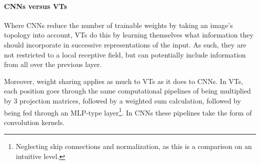





\paragraph{CNNs versus VTs}
Where CNNs reduce the number of trainable weights by taking an image's topology into account, VTs do this by learning themselves what information they should incorporate in successive representations of the input. As such, they are not restricted to a local receptive field, but can potentially include information from all over the previous layer.

Moreover, weight sharing applies as much to VTs as it does to CNNs. In VTs, each position goes through the same computational pipelines of being multiplied by 3 projection matrices, followed by a weighted sum calculation, followed by being fed through an MLP-type layer\footnote{Neglecting skip connections and normalization, as this is a comparison on an intuitive level.}. In CNNs these pipelines take the form of convolution kernels.

